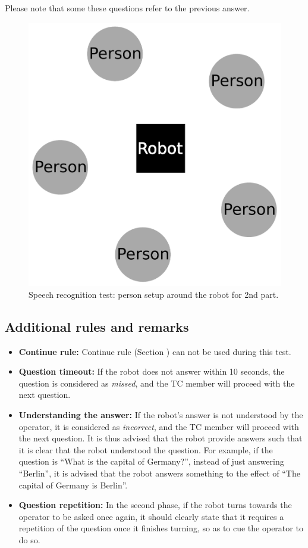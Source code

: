 Please note that some these questions refer to the previous answer. 

\begin{figure}[!h]
	\centering
	\includegraphics[width=0.5\columnwidth]{images/asrsetup.pdf}
	\caption{Speech recognition test: person setup around the robot for 2nd part.}
	\label{fig:asrsetup}
\end{figure}



\subsection{Additional rules and remarks}

\begin{itemize}
\item \textbf{Continue rule:} Continue rule (Section ) can not be used during this test.
\item \textbf{Question timeout:} If the robot does not answer within 10 seconds, the question is considered as \textit{missed}, and the TC member will proceed with the next question.
\item \textbf{Understanding the answer:} If the robot's answer is not understood by the operator, it is considered as \textit{incorrect}, and the TC member will proceed with the next question. It is thus advised that the robot provide answers such that it is clear that the robot understood the question. For example, if the question is ``What is the capital of Germany?'', instead of just answering ``Berlin'', it is advised that the robot answers something to the effect of ``The capital of Germany is Berlin''.
\item \textbf{Question repetition:} In the second phase, if the robot turns towards the operator to be asked once again, it should clearly state that it requires a repetition of the question once it finishes turning, so as to cue the operator to do so.
\end{itemize}


